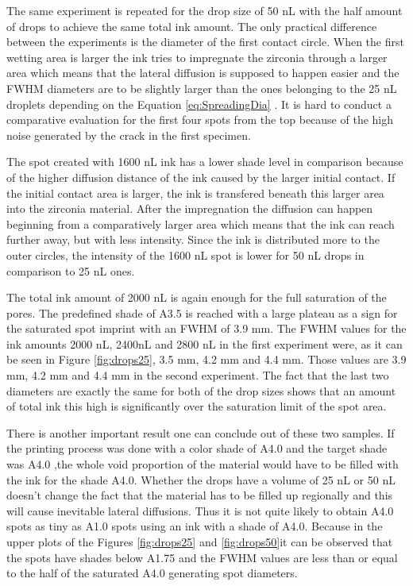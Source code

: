 \bigskip 
 The same experiment is repeated for the drop size of 50 nL with the half amount of drops to achieve the same total ink amount. The only practical difference between the experiments is the diameter of the first contact circle. When the first wetting area is larger the ink tries to impregnate the zirconia through a larger area which means that the lateral diffusion is supposed to happen easier and the FWHM diameters are to be slightly larger than the ones belonging to the 25 nL droplets depending on the Equation \ref{eq:SpreadingDia} . It is hard to conduct a comparative evaluation for the first four spots from the top because of the high noise generated by the crack in the first specimen. 
 
 The spot created with 1600 nL ink has a lower shade level in comparison because of the higher diffusion distance of the ink caused by the larger initial contact. If the initial contact area is larger, the ink is transfered beneath this larger area into the zirconia material. After the impregnation the diffusion can happen beginning from a comparatively larger area which means that the ink can reach further away, but with less intensity. Since the ink is distributed more to the outer circles, the intensity of the 1600 nL spot is lower for 50 nL drops in comparison to 25 nL ones.
  
 The total ink amount of 2000 nL is again enough for the full saturation of the pores. The predefined shade of A3.5 is reached with a large plateau as a sign for the saturated spot imprint with an FWHM of 3.9 mm. The FWHM values for the ink amounts 2000 nL, 2400nL and 2800 nL in the first experiment were, as it can be seen in Figure \ref{fig:drops25}, 3.5 mm, 4.2 mm and 4.4 mm. Those values are 3.9 mm, 4.2 mm and 4.4 mm in the second experiment. The fact that the last two diameters are exactly the same for both of the drop sizes shows that an amount of total ink this high is significantly over the saturation limit of the spot area. 
 
 There is another important result one can conclude out of these two samples. If the printing process was done with a color shade of A4.0 and the target shade was A4.0 ,the whole void proportion of the material would have to be filled with the ink for the shade A4.0. Whether the drops have a volume of 25 nL or 50 nL doesn't change the fact that the material has to be filled up regionally and this will cause inevitable  lateral diffusions. Thus it is not quite likely to obtain A4.0 spots as tiny as A1.0 spots using an ink with a shade of A4.0. Because in the upper plots of the Figures \ref{fig:drops25} and \ref{fig:drops50}it can be observed that the spots have shades below A1.75 and the FWHM values are less than or equal to the half of the saturated A4.0 generating spot diameters.
